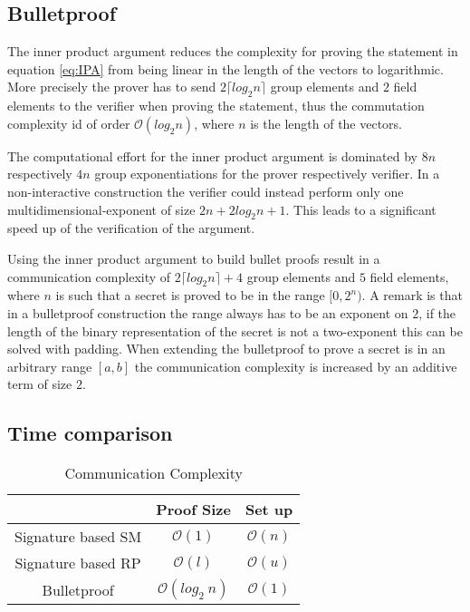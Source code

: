 


\subsection{Bulletproof}
The inner product argument reduces the complexity for proving the statement  in equation \eqref{eq:IPA} from being linear in the length of the vectors to logarithmic. More precisely the prover has to send $2\lceil log_2 n \rceil$ group elements and $2$ field elements to the verifier when proving the statement, thus the commutation complexity id of order $\mathcal{O}(log_2 n)$, where $n$ is the length of the vectors. 

The computational effort for the inner product argument is dominated by $8n$ respectively $4n$ group exponentiations for the prover respectively verifier. In a non-interactive construction the verifier could instead perform only one multidimensional-exponent of size $2n+ 2log_2n +1$. This leads to a significant speed up of the verification of the argument.     

Using the inner product argument to build bullet proofs result in a communication complexity of $2\lceil log_2 n \rceil +4$ group elements and $5$ field elements, where $n$ is such that a secret  is proved to be in the range $[0,2^n)$.  A remark is that in a bulletproof construction the range always has to be an exponent on $2$, if the length of the binary representation of the secret is not a two-exponent this can be solved with padding. When extending the bulletproof to prove a secret is in an arbitrary range $[a,b]$ the communication complexity is increased by an additive term of size $2$. 


 

\subsection{Time comparison}
\begin{table}[H]
\label{tab:compare}
\caption{Communication Complexity}
\begin{tabular}{| *{3}{c|}}
			 \hline
    									&Proof Size 		&		Set up  \\ \hline		
  Signature based SM  	&   $\mathcal{O} (1) $ 					 &			 $\mathcal{O} (n)$				\\ \hline 
  Signature based RP  	&   $\mathcal{O} (l )$   	&	$\mathcal{O} (u)$ 
  	\\ \hline
  Bulletproof   				&   $ \mathcal{O} (  log_2\: n ) $  & $\mathcal{O} (1)$ 	\\
  \hline			
\end{tabular}
 \end{table}
	


